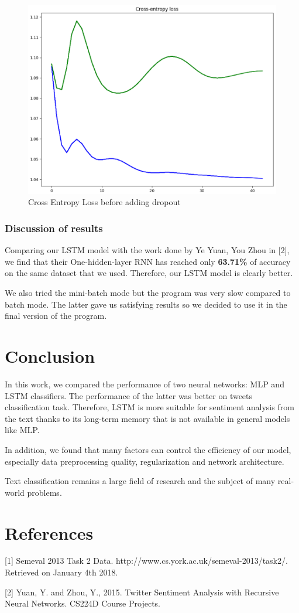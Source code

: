\documentclass[a4paper,english,12pt]{article}
\begin{document}
\begin{figure}[H]
	\centering
	\includegraphics[scale=1]{overfitting}
	\caption{Cross Entropy Loss before adding dropout}
\end{figure}

\subsubsection{Discussion of results}
Comparing our LSTM model with the work done by Ye Yuan, You Zhou in [2], we find that their One-hidden-layer RNN has reached only \textbf{63.71\%} of accuracy on the same dataset that we used. Therefore, our LSTM model is clearly better.

We also tried the mini-batch mode but the program was very slow compared to batch mode. The latter gave us satisfying results so we decided to use it in the final version of the program.

\section{Conclusion}
In this work, we compared the performance of two neural networks: MLP and LSTM classifiers. The performance of the latter was better on tweets classification task. Therefore, LSTM is more suitable for sentiment analysis from the text thanks to its long-term memory that is not available in general models like MLP.

In addition, we found that many factors can control the efficiency of our model, especially data preprocessing quality, regularization and network architecture.

Text classification remains a large field of research and the subject of many real-world problems.

\section{References}
[1] Semeval 2013 Task 2 Data. http://www.cs.york.ac.uk/semeval-2013/task2/. Retrieved on January 4th 2018.

[2] Yuan, Y. and Zhou, Y., 2015. Twitter Sentiment Analysis with Recursive Neural Networks. CS224D Course Projects.
\end{document}
